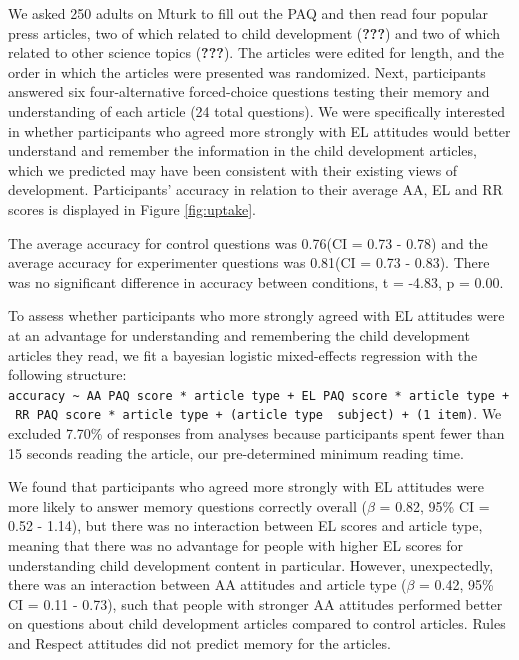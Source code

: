 \documentclass[floatsintext,man]{apa6}
\theoremstyle{definition}
\theoremstyle{definition}
\theoremstyle{definition}
\theoremstyle{remark}
\begin{document}
We asked 250 adults on Mturk to fill out the PAQ and then read four
popular press articles, two of which related to child development
({\textbf{???}}) and two of which related to other science topics
({\textbf{???}}). The articles were edited for length, and the order in
which the articles were presented was randomized. Next, participants
answered six four-alternative forced-choice questions testing their
memory and understanding of each article (24 total questions). We were
specifically interested in whether participants who agreed more strongly
with EL attitudes would better understand and remember the information
in the child development articles, which we predicted may have been
consistent with their existing views of development. Participants'
accuracy in relation to their average AA, EL and RR scores is displayed
in Figure \ref{fig:uptake}.

The average accuracy for control questions was 0.76(CI = 0.73 - 0.78)
and the average accuracy for experimenter questions was 0.81(CI = 0.73 -
0.83). There was no significant difference in accuracy between
conditions, t = -4.83, p = 0.00.

To assess whether participants who more strongly agreed with EL
attitudes were at an advantage for understanding and remembering the
child development articles they read, we fit a bayesian logistic
mixed-effects regression with the following structure:
\texttt{accuracy\ \textasciitilde{}\ AA\ PAQ\ score\ *\ article\ type\ +\ EL\ PAQ\ score\ *\ article\ type\ +\ RR\ PAQ\ score\ *\ article\ type\ +\ (article\ type\ \textbar{}\ subject)\ +\ (1\textbar{}\ item)}.
We excluded 7.70\% of responses from analyses because participants spent
fewer than 15 seconds reading the article, our pre-determined minimum
reading time.

We found that participants who agreed more strongly with EL attitudes
were more likely to answer memory questions correctly overall (\(\beta\)
= 0.82, 95\% CI = 0.52 - 1.14), but there was no interaction between EL
scores and article type, meaning that there was no advantage for people
with higher EL scores for understanding child development content in
particular. However, unexpectedly, there was an interaction between AA
attitudes and article type (\(\beta\) = 0.42, 95\% CI = 0.11 - 0.73),
such that people with stronger AA attitudes performed better on
questions about child development articles compared to control articles.
Rules and Respect attitudes did not predict memory for the articles.
\end{document}
